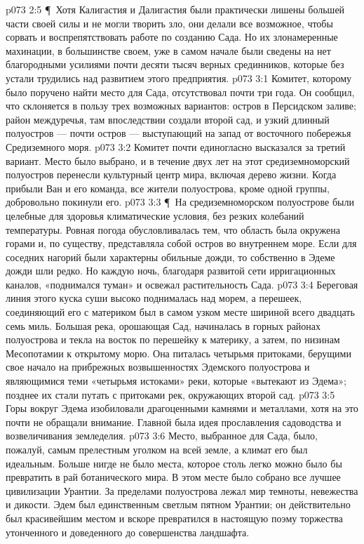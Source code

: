 \vs p073 2:5 \P\ Хотя Калигастия и Далигастия были практически лишены большей части своей силы и не могли творить зло, они делали все возможное, чтобы сорвать и воспрепятствовать работе по созданию Сада. Но их злонамеренные махинации, в большинстве своем, уже в самом начале были сведены на нет благородными усилиями почти десяти тысяч верных срединников, которые без устали трудились над развитием этого предприятия.
\vs p073 3:1 Комитет, которому было поручено найти место для Сада, отсутствовал почти три года. Он сообщил, что склоняется в пользу трех возможных вариантов: остров в Персидском заливе; район междуречья, там впоследствии создали второй сад, и узкий длинный полуостров --- почти остров --- выступающий на запад от восточного побережья Средиземного моря.
\vs p073 3:2 Комитет почти единогласно высказался за третий вариант. Место было выбрано, и в течение двух лет на этот средиземноморский полуостров перенесли культурный центр мира, включая дерево жизни. Когда прибыли Ван и его команда, все жители полуострова, кроме одной группы, добровольно покинули его.
\vs p073 3:3 \P\ На средиземноморском полуострове были целебные для здоровья климатические условия, без резких колебаний температуры. Ровная погода обусловливалась тем, что область была окружена горами и, по существу, представляла собой остров во внутреннем море. Если для соседних нагорий были характерны обильные дожди, то собственно в Эдеме дожди шли редко. Но каждую ночь, благодаря развитой сети ирригационных каналов, «поднимался туман» и освежал растительность Сада.
\vs p073 3:4 Береговая линия этого куска суши высоко поднималась над морем, а перешеек, соединяющий его с материком был в самом узком месте шириной всего двадцать семь миль. Большая река, орошающая Сад, начиналась в горных районах полуострова и текла на восток по перешейку к материку, а затем, по низинам Месопотамии к открытому морю. Она питалась четырьмя притоками, берущими свое начало на прибрежных возвышенностях Эдемского полуострова и являющимися теми «четырьмя истоками» реки, которые «вытекают из Эдема»; позднее их стали путать с притоками рек, окружающих второй сад.
\vs p073 3:5 Горы вокруг Эдема изобиловали драгоценными камнями и металлами, хотя на это почти не обращали внимание. Главной была идея прославления садоводства и возвеличивания земледелия.
\vs p073 3:6 Место, выбранное для Сада, было, пожалуй, самым прелестным уголком на всей земле, а климат его был идеальным. Больше нигде не было места, которое столь легко можно было бы превратить в рай ботанического мира. В этом месте было собрано все лучшее цивилизации Урантии. За пределами полуострова лежал мир темноты, невежества и дикости. Эдем был единственным светлым пятном Урантии; он действительно был красивейшим местом и вскоре превратился в настоящую поэму торжества утонченного и доведенного до совершенства ландшафта.
